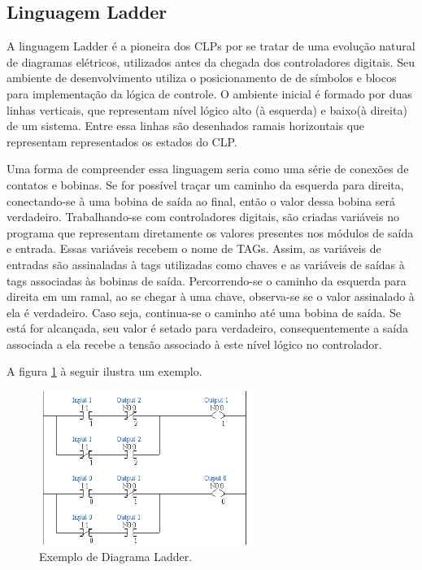 \subsection{Linguagem Ladder} \label{subsec:ladder}
A linguagem Ladder é a pioneira dos CLPs por se tratar de uma evolução natural de diagramas elétricos, utilizados antes da chegada dos controladores digitais.  Seu ambiente de desenvolvimento utiliza o posicionamento de de símbolos e blocos para implementação da lógica de controle. 
O ambiente inicial é formado por duas linhas verticais, que representam nível lógico alto (à esquerda) e baixo(à direita) de um sistema. Entre essa linhas são desenhados ramais horizontais que representam representados os estados do CLP.

Uma forma de compreender essa linguagem seria como uma série de conexões de contatos e bobinas. Se for possível traçar um caminho da esquerda para direita, conectando-se à uma bobina de saída ao final, então o valor dessa bobina será verdadeiro. Trabalhando-se com controladores digitais, são criadas variáveis no programa que representam diretamente os valores presentes nos módulos de saída e entrada. Essas variáveis recebem o nome de TAGs. Assim, as variáveis de entradas são assinaladas à tags utilizadas como chaves e as variáveis de saídas à tags associadas às bobinas de saída. Percorrendo-se o caminho da esquerda para direita em um ramal, ao se chegar à uma chave, observa-se se o valor assinalado à ela é verdadeiro. Caso seja, continua-se o caminho até uma bobina de saída. Se está for alcançada, seu valor é setado para verdadeiro, consequentemente a saída associada a ela recebe a tensão associado à este nível lógico no controlador.

A figura \ref{fig:ladder} à seguir ilustra um exemplo.

\begin{figure}[H]
	\centering
	\includegraphics[height=5cm,keepaspectratio]{figs/ladder.png}
	\caption{Exemplo de Diagrama Ladder.}
	\label{fig:ladder}
\end{figure}

